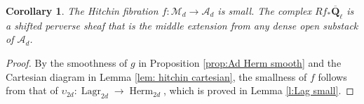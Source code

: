 \documentclass[reqno]{amsart}
\numberwithin{equation}{section}
\newcommand{\Q}{\mathbf{Q}}
\newcommand{\Cal}[1]{\mathcal{#1}}
\newcommand{\co}{\colon}
\DeclareMathOperator{\GL}{GL}
\DeclareMathOperator{\Bun}{Bun}
\DeclareMathOperator{\Herm}{Herm}
\DeclareMathOperator{\Lagr}{Lagr}
\newcommand{\Qlbar}{\overline{\Q}_\ell}
\newcommand\cA{\mathcal{A}}
\newcommand\cM{\mathcal{M}}
\newtheorem{cor}[thm]{Corollary}
\theoremstyle{remark}
\numberwithin{equation}{section}
\begin{document}





\begin{cor}\label{c:small} 
The Hitchin fibration $f \co \cM_d \rightarrow \cA_d$ is small. The complex $Rf_{*}\Qlbar$ is a shifted perverse sheaf that is the middle extension from any dense open substack of $\cA_{d}$.
\end{cor}
\begin{proof}
By the smoothness of $g$ in Proposition \ref{prop:Ad Herm smooth} and the Cartesian diagram in Lemma \ref{lem: hitchin cartesian}, the smallness of $f$ follows from that of $\upsilon_{2d}: \Lagr_{2d}\to \Herm_{2d}$, which is proved in Lemma \ref{l:Lag small}.
\end{proof}
\end{document}
